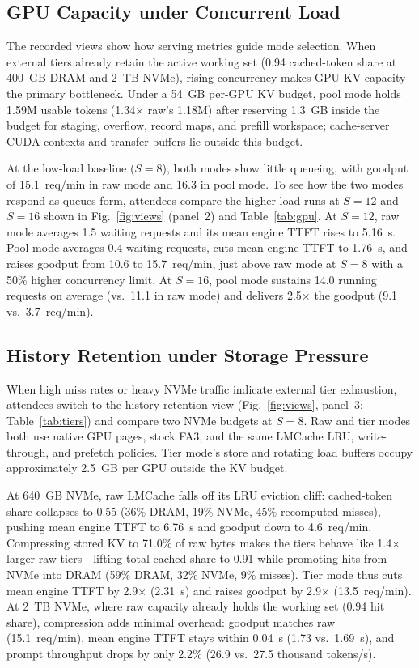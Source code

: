 \documentclass[conference]{IEEEtran}
\begin{document}
\subsection*{GPU Capacity under Concurrent Load}
The recorded views show how serving metrics guide mode selection. When
external tiers already retain the active working set (0.94 cached-token share
at 400~GB DRAM and 2~TB NVMe), rising concurrency makes GPU KV capacity the
primary bottleneck. Under a 54~GB per-GPU KV budget, pool mode holds 1.59M
usable tokens (1.34$\times$ raw's 1.18M) after reserving 1.3~GB inside the
budget for staging, overflow, record maps, and prefill workspace; cache-server
CUDA contexts and transfer buffers lie outside this budget.

At the low-load baseline ($S{=}8$), both modes show little queueing, with
goodput of 15.1~req/min in raw mode and 16.3 in pool mode. To see how the two
modes respond as queues form, attendees compare the higher-load runs at
$S{=}12$ and $S{=}16$ shown in Fig.~\ref{fig:views} (panel~2) and
Table~\ref{tab:gpu}.
At $S{=}12$, raw mode averages 1.5 waiting requests and its mean engine TTFT
rises to 5.16~s. Pool mode averages 0.4 waiting requests, cuts mean engine
TTFT to 1.76~s, and raises goodput from 10.6 to 15.7~req/min, just above
raw mode at $S{=}8$ with a 50\% higher concurrency limit.
At $S{=}16$, pool mode sustains 14.0 running requests
on average (vs.\ 11.1 in raw mode) and delivers 2.5$\times$ the goodput
(9.1 vs.\ 3.7~req/min).

\balance
\subsection*{History Retention under Storage Pressure}
When high miss rates or heavy NVMe traffic indicate external tier exhaustion,
attendees switch to the history-retention view (Fig.~\ref{fig:views}, panel~3;
Table~\ref{tab:tiers})
and compare two NVMe budgets at $S{=}8$. Raw and tier modes both use native
GPU pages, stock FA3, and the same LMCache LRU, write-through, and prefetch
policies. Tier mode's store and rotating load buffers occupy
approximately 2.5~GB per GPU outside the KV budget.

At 640~GB NVMe, raw LMCache falls off its LRU eviction cliff: cached-token
share collapses to 0.55 (36\% DRAM, 19\% NVMe, 45\% recomputed misses), pushing
mean engine TTFT to 6.76~s and goodput down to 4.6~req/min. Compressing stored
KV to 71.0\% of raw bytes makes the tiers behave like 1.4$\times$ larger raw
tiers---lifting total cached share to 0.91 while promoting hits from NVMe into
DRAM (59\% DRAM, 32\% NVMe, 9\% misses). Tier mode thus cuts mean engine TTFT
by 2.9$\times$ (2.31~s) and raises goodput by 2.9$\times$ (13.5~req/min). At
2~TB NVMe, where raw capacity already holds the working set (0.94 hit share),
compression adds minimal overhead: goodput matches raw (15.1~req/min), mean
engine TTFT stays within 0.04~s (1.73 vs.\ 1.69~s), and prompt throughput drops
by only 2.2\% (26.9 vs.\ 27.5 thousand tokens/s).
\end{document}
